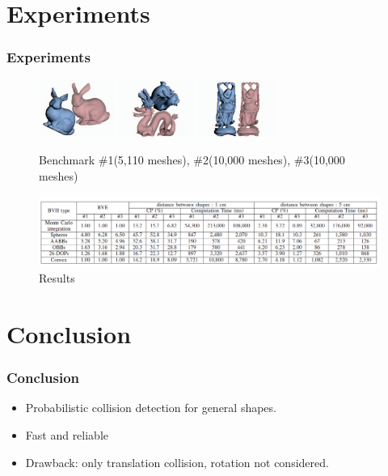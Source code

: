 \documentclass{beamer}
\begin{document}
\section{Experiments}
\begin{frame}
	\frametitle{Experiments}
	\begin{figure}	
		\includegraphics[width=2.5cm]{imgs/Benchmark1.png}
		\includegraphics[width=2.5cm]{imgs/Benchmark2.png}
		\includegraphics[width=2.5cm]{imgs/Benchmark3.png}
		\caption{Benchmark \#1(5,110 meshes), \#2(10,000 meshes), \#3(10,000 meshes)}
	\end{figure}
	\begin{figure}	
		\includegraphics[width=12cm]{imgs/Table.png}
		\caption{Results}
	\end{figure}
\end{frame}



\section{Conclusion}

\begin{frame}
	\frametitle{Conclusion}
	\begin{itemize}
		\item Probabilistic collision detection for general shapes.
		\item Fast and reliable
		\item Drawback: only translation collision, rotation not considered.
	\end{itemize}
\end{frame}

\end{document}
